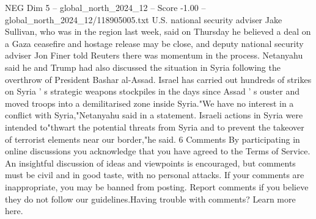 \begin{textsample}{NEG Dim 5 – global\_north\_2024\_12 – Score -1.00 – global\_north\_2024\_12/118905005.txt}
U.S. national security adviser Jake Sullivan, who was in the region last week, said on Thursday he believed a deal on a Gaza ceasefire and hostage release may be close, and deputy national security adviser Jon Finer told Reuters there was momentum in the process.
Netanyahu said he and Trump had also discussed the situation in Syria following the overthrow of President Bashar al-Assad.
Israel has carried out hundreds of strikes on Syria ' s strategic weapons stockpiles in the days since Assad ' s ouster and moved troops into a demilitarised zone inside Syria."We have no interest in a conflict with Syria,"Netanyahu said in a statement.
Israeli actions in Syria were intended to"thwart the potential threats from Syria and to prevent the takeover of terrorist elements near our border,"he said. 6 Comments By participating in online discussions you acknowledge that you have agreed to the Terms of Service.
An insightful discussion of ideas and viewpoints is encouraged, but comments must be civil and in good taste, with no personal attacks.
If your comments are inappropriate, you may be banned from posting.
Report comments if you believe they do not follow our guidelines.Having trouble with comments?
Learn more here.

\end{textsample}
